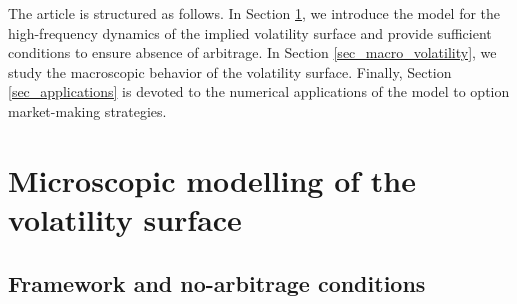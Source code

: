 \documentclass[12pt]{article}
\begin{document}
\medskip
The article is structured as follows. In Section \ref{sec_micro_model}, we introduce the model for the high-frequency dynamics of the implied volatility surface and provide sufficient conditions to ensure absence of arbitrage. In Section \ref{sec_macro_volatility}, we study the macroscopic behavior of the volatility surface. Finally, Section \ref{sec_applications} is devoted to the numerical applications of the model to option market-making strategies.

\section{Microscopic modelling of the volatility surface}\label{sec_micro_model}

\subsection{Framework and no-arbitrage conditions}
\end{document}
